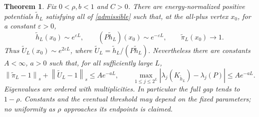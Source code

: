 \documentclass[11pt]{article}
\newcommand{\norm}[1]{\left\|#1\right\|}
\newtheorem{theorem}{Theorem}[section]
\begin{document}
\begin{theorem}\label{vanishingdenominatortheorem}
Fix $0<\rho,b<1$ and $C>0$. There are energy-normalized positive
potentials $\widetilde h_L$ satisfying all of \eqref{admissible} such that,
at the all-plus vertex $x_0$, for a constant $\varepsilon>0$,
\[
 \widetilde h_L(x_0)\sim e^{\varepsilon L},\qquad
 (P\widetilde h_L)(x_0)\sim e^{-\varepsilon L},\qquad
 \widetilde\pi_L(x_0)\longrightarrow1.
\]
Thus $\widetilde U_L(x_0)\sim e^{2\varepsilon L}$, where
$\widetilde U_L=\widetilde h_L/(P\widetilde h_L)$. Nevertheless there
are constants $A<\infty$, $a>0$ such that, for all sufficiently large $L$,
\[
 \norm{\widetilde\pi_L-1}_s+\norm{\widetilde U_L-1}_s
       \leq Ae^{-aL},\qquad
 \max_{1\leq j\leq2^L}
 |\lambda_j(K_{\widetilde h_L})-\lambda_j(P)|\leq Ae^{-aL}.
\]
Eigenvalues are ordered with multiplicities. In particular the full gap
tends to $1-\rho$. Constants and the eventual threshold may depend on
the fixed parameters; no uniformity as $\rho$ approaches its endpoints
is claimed.
\end{theorem}
\end{document}

